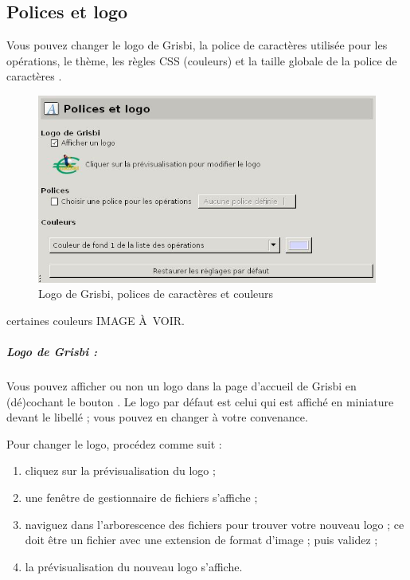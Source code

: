 \subsection{Polices et logo\label{setup-display-logo}}

Vous pouvez changer le logo de Grisbi, la police de caractères utilisée pour les opérations, le thème, les règles CSS (couleurs) et la taille globale de la police de caractères \ifIllustration  {}.
\begin{figure}[htbp]
\begin{center}
\includegraphics[scale=0.5]{image/screenshot/setup_fonts_logo}
\end{center}
\caption{Logo de Grisbi, polices de caractères et couleurs}
\label{setup-fonts-logo-img}
\end{figure}
\else certaines couleurs IMAGE À VOIR.
\fi


\subparagraph{Logo de Grisbi :\label{setup-display-logo-icon}}

Vous pouvez afficher ou non un logo dans la page d'accueil de Grisbi en (dé)cochant le bouton . Le logo par défaut est celui qui est affiché en miniature devant le libellé  ; vous pouvez en changer à votre convenance. 

Pour changer le logo, procédez comme suit :

\begin{enumerate}
	\item cliquez sur la prévisualisation du logo ;
	\item une fenêtre de gestionnaire de fichiers s'affiche ;
	\item naviguez dans l'arborescence des fichiers pour trouver votre nouveau logo ; ce doit être un fichier avec une extension de format d'image ; puis validez ;
	\item la prévisualisation du nouveau logo s'affiche.
\end{enumerate}

